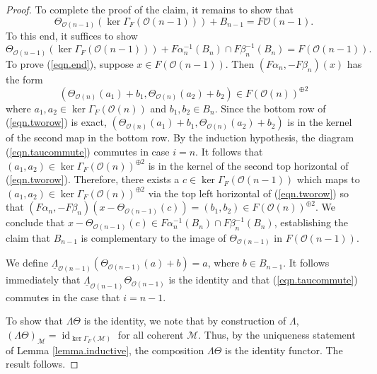 \documentclass[10pt]{amsart}
\theoremstyle{definition}
\theoremstyle{remark}
\numberwithin{equation}{section}
\begin{document}
\begin{proof}
To complete the proof of the claim, it remains to show that
$$
\Theta_{\mathcal{O}(n-1)}({\operatorname{ker }\Gamma_{F}} (\mathcal{O}(n-1))) + B_{n-1}= F\mathcal{O}(n-1).
$$
To this end, it suffices to show
\begin{equation} \label{eqn.end}
\Theta_{\mathcal{O}(n-1)}({\operatorname{ker }\Gamma_{F}} (\mathcal{O}(n-1)))+F\alpha_{n}^{-1}(B_{n}) \cap F\beta_{n}^{-1}(B_{n})=F(\mathcal{O}(n-1)).
\end{equation}
To prove (\ref{eqn.end}), suppose $x \in F(\mathcal{O}(n-1))$.  Then $(F\alpha_{n},-F\beta_{n})(x)$ has the form
$$
(\Theta_{\mathcal{O}(n)}(a_1)+b_{1},\Theta_{\mathcal{O}(n)}(a_2)+b_{2})\in F(\mathcal{O}(n))^{\oplus 2}
$$
where $a_1,a_2 \in {\operatorname{ker }\Gamma_{F}} (\mathcal{O}(n))$ and $b_1,b_2 \in B_{n}$.  Since the bottom row of (\ref{eqn.tworow}) is exact, $(\Theta_{\mathcal{O}(n)}(a_1)+b_1,\Theta_{\mathcal{O}(n)}(a_2)+b_2)$ is in the kernel of the second map in the bottom row.  By the induction hypothesis, the diagram (\ref{eqn.taucommute}) commutes in case $i=n$.  It follows that $(a_1,a_2) \in {\operatorname{ker }\Gamma_{F}} (\mathcal{O}(n))^{\oplus 2}$ is in the kernel of the second top horizontal of (\ref{eqn.tworow}).  Therefore, there exists a $c \in {\operatorname{ker }\Gamma_{F}}(\mathcal{O}(n-1))$ which maps to $(a_1,a_2) \in {\operatorname{ker }\Gamma_{F}} (\mathcal{O}(n))^{\oplus 2}$ via the top left horizontal of (\ref{eqn.tworow}) so that $(F\alpha_{n},-F\beta_{n})(x-\Theta_{\mathcal{O}(n-1)}(c))=(b_1,b_2) \in F(\mathcal{O}(n))^{\oplus 2}$.  We conclude that $x-\Theta_{\mathcal{O}(n-1)}(c) \in F\alpha_{n}^{-1}(B_{n}) \cap F\beta_{n}^{-1}(B_{n})$, establishing the claim that $B_{n-1}$ is complementary to the image of $\Theta_{\mathcal{O}(n-1)}$ in $F(\mathcal{O}(n-1))$.

We define $\underline{\Lambda}_{\mathcal{O}(n-1)}(\Theta_{\mathcal{O}(n-1)}(a)+b)=a$, where $b \in B_{n-1}$.  It follows immediately that $\underline{\Lambda}_{\mathcal{O}(n-1)} \Theta_{\mathcal{O}(n-1)}$ is the identity and that (\ref{eqn.taucommute}) commutes in the case that $i=n-1$.

 To show that $\Lambda \Theta$ is the identity, we note that by construction of $\Lambda$, $(\Lambda \Theta)_{\mathcal{M}}=\operatorname{id }_{{\operatorname{ker }\Gamma_{F}}(\mathcal{M})}$ for all coherent $\mathcal{M}$.  Thus, by the uniqueness statement of Lemma \ref{lemma.inductive}, the composition $\Lambda \Theta$ is the identity functor.  The result follows.
\end{proof}
\end{document}
